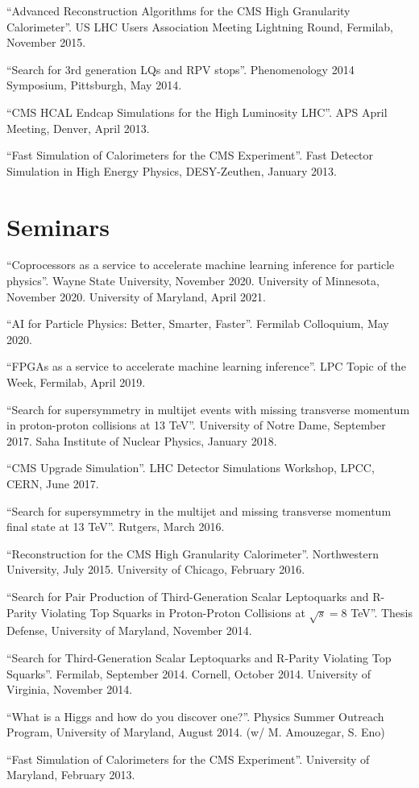 \begin{description}[leftmargin=12pt,font=\normalfont,labelsep=0em]
\item ``Advanced Reconstruction Algorithms for the CMS High Granularity Calorimeter''. US LHC Users Association Meeting Lightning Round, Fermilab, November 2015.
\item ``Search for 3rd generation LQs and RPV stops''. Phenomenology 2014 Symposium, Pittsburgh, May 2014.
\item ``CMS HCAL Endcap Simulations for the High Luminosity LHC''. APS April Meeting, Denver, April 2013.
\item ``Fast Simulation of Calorimeters for the CMS Experiment''. Fast Detector Simulation in High Energy Physics, DESY-Zeuthen, January 2013.
\end{description}

\section{Seminars}
\begin{description}[leftmargin=12pt,font=\normalfont,labelsep=0em]
\item ``Coprocessors as a service to accelerate machine learning inference for particle physics''. Wayne State University, November 2020. University of Minnesota, November 2020. University of Maryland, April 2021.
\item ``AI for Particle Physics: Better, Smarter, Faster''. Fermilab Colloquium, May 2020.
\item ``FPGAs as a service to accelerate machine learning inference''. LPC Topic of the Week, Fermilab, April 2019.
\item ``Search for supersymmetry in multijet events with missing transverse momentum in proton-proton collisions at 13 TeV''. University of Notre Dame, September 2017. Saha Institute of Nuclear Physics, January 2018.
\item ``CMS Upgrade Simulation''. LHC Detector Simulations Workshop, LPCC, CERN, June 2017.
\item ``Search for supersymmetry in the multijet and missing transverse momentum final state at 13 TeV''. Rutgers, March 2016.
\item ``Reconstruction for the CMS High Granularity Calorimeter''. Northwestern University, July 2015. University of Chicago, February 2016.
\item ``Search for Pair Production of Third-Generation Scalar Leptoquarks and R-Parity Violating Top Squarks in Proton-Proton Collisions at $\sqrt{s}=8$ TeV''. Thesis Defense, University of Maryland, November 2014.
\item ``Search for Third-Generation Scalar Leptoquarks and R-Parity Violating Top Squarks''. Fermilab, September 2014. Cornell, October 2014. University of Virginia, November 2014.
\ifdefined\longflag
\item ``What is a Higgs and how do you discover one?''. Physics Summer Outreach Program, University of Maryland, August 2014. (w/ M. Amouzegar, S. Eno)
\fi
\item ``Fast Simulation of Calorimeters for the CMS Experiment''. University of Maryland, February 2013.
\end{description}

